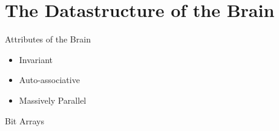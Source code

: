 
\section{The Datastructure of the Brain}


\begin{frame}[c]{Attributes of the Brain}
    \begin{itemize}[<+(1)->]
        \item Invariant
        \item Auto-associative
        \item Massively Parallel
    \end{itemize}
\end{frame}



\begin{frame}[c]{Bit Arrays}
    \Large
    \pause
\end{frame}


